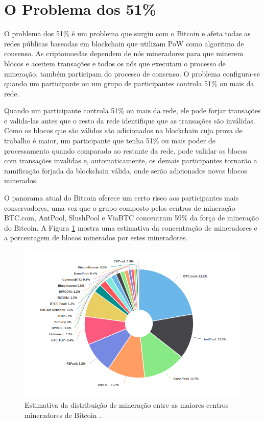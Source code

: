 \documentclass[tcc,capa]{texufpel}
\begin{document}
\section{O Problema dos 51\%}

    O problema dos 51\% é um problema que surgiu com o Bitcoin e afeta todas as redes públicas baseadas em blockchain que utilizam PoW como algoritmo de consenso. As criptomoedas dependem de nós mineradores para que minerem blocos e aceitem transações e todos os nós que executam o processo de mineração, também participam do processo de consenso. O problema configura-se quando um participante ou um grupo de participantes controla 51\% ou mais da rede.
    
    Quando um participante controla 51\% ou mais da rede, ele pode forjar transações e valida-las antes que o resto da rede identifique que as transações são inválidas. Como os blocos que são válidos são adicionados na blockchain cuja prova de trabalho é maior, um participante que tenha 51\% ou mais poder de processamento quando comparado ao restante da rede, pode validar os blocos com transações invalidas e, automaticamente, os demais participantes tornarão a ramificação forjada da blockchain válida, onde serão adicionados novos blocos minerados.
    
    O panorama atual do Bitcoin oferece um certo risco aos participantes mais conservadores, uma vez que o grupo composto pelos centros de mineração BTC.com, AntPool, SlushPool e ViaBTC concentram 59\% da força de mineração do Bitcoin. A Figura \ref{fig:pools-bitcoin} mostra uma estimativa da concentração de mineradores e a porcentagem de blocos minerados por estes mineradores.
    
    \begin{figure}[ht]
        \centering
        \includegraphics[width=17cm]{imagens/pools-bitcoin.png}
        \caption{Estimativa da distribuição de mineração entre as maiores centros mineradores de Bitcoin \cite{blockchain2018}.}
        \label{fig:pools-bitcoin}
    \end{figure}
    
\end{document}
